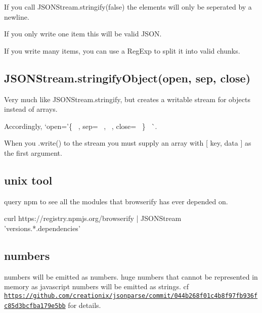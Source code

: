 If you call {\ttfamily J\+S\+O\+N\+Stream.\+stringify(false)} the elements will only be seperated by a newline.

If you only write one item this will be valid J\+S\+ON.

If you write many items, you can use a {\ttfamily Reg\+Exp} to split it into valid chunks.

\subsection*{J\+S\+O\+N\+Stream.\+stringify\+Object(open, sep, close)}

Very much like {\ttfamily J\+S\+O\+N\+Stream.\+stringify}, but creates a writable stream for objects instead of arrays.

Accordingly, `open='\{~\newline
\textquotesingle{}, sep=\textquotesingle{}~\newline
,~\newline
\textquotesingle{}, close=\textquotesingle{}~\newline
\}~\newline
\textquotesingle{}\`{}.

When you {\ttfamily .write()} to the stream you must supply an array with {\ttfamily \mbox{[} key, data \mbox{]}} as the first argument.

\subsection*{unix tool}

query npm to see all the modules that browserify has ever depended on.


\begin{DoxyCode}
curl https://registry.npmjs.org/browserify | JSONStream 'versions.*.dependencies'
\end{DoxyCode}


\subsection*{numbers}

numbers will be emitted as numbers. huge numbers that cannot be represented in memory as javascript numbers will be emitted as strings. cf \href{https://github.com/creationix/jsonparse/commit/044b268f01c4b8f97fb936fc85d3bcfba179e5bb}{\tt https\+://github.\+com/creationix/jsonparse/commit/044b268f01c4b8f97fb936fc85d3bcfba179e5bb} for details.

